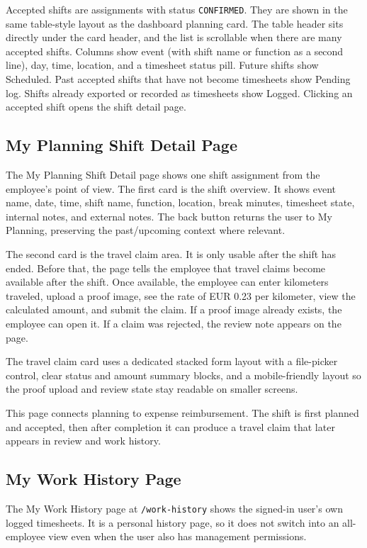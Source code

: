 \documentclass[11pt]{article}
\newcommand{\code}[1]{\nolinkurl{#1}}
\begin{document}
Accepted shifts are assignments with status \code{CONFIRMED}. They are shown in the same table-style layout as the dashboard planning card. The table header sits directly under the card header, and the list is scrollable when there are many accepted shifts. Columns show event (with shift name or function as a second line), day, time, location, and a timesheet status pill. Future shifts show Scheduled. Past accepted shifts that have not become timesheets show Pending log. Shifts already exported or recorded as timesheets show Logged. Clicking an accepted shift opens the shift detail page.

\subsection{My Planning Shift Detail Page}

The My Planning Shift Detail page shows one shift assignment from the employee's point of view. The first card is the shift overview. It shows event name, date, time, shift name, function, location, break minutes, timesheet state, internal notes, and external notes. The back button returns the user to My Planning, preserving the past/upcoming context where relevant.

The second card is the travel claim area. It is only usable after the shift has ended. Before that, the page tells the employee that travel claims become available after the shift. Once available, the employee can enter kilometers traveled, upload a proof image, see the rate of EUR 0.23 per kilometer, view the calculated amount, and submit the claim. If a proof image already exists, the employee can open it. If a claim was rejected, the review note appears on the page.

The travel claim card uses a dedicated stacked form layout with a file-picker control, clear status and amount summary blocks, and a mobile-friendly layout so the proof upload and review state stay readable on smaller screens.

This page connects planning to expense reimbursement. The shift is first planned and accepted, then after completion it can produce a travel claim that later appears in review and work history.

\subsection{My Work History Page}

The My Work History page at \code{/work-history} shows the signed-in user's own logged timesheets. It is a personal history page, so it does not switch into an all-employee view even when the user also has management permissions.
\end{document}
